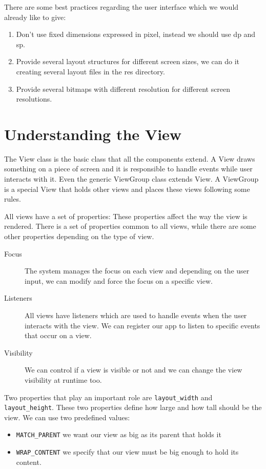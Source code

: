 There are some best practices regarding the user interface which we would already like to give:

\begin{framed}
	
	
	\begin{enumerate}
		\item Don’t use fixed dimensions expressed in pixel, instead we should use dp and sp.
		\item Provide several layout structures for different screen sizes, we can do it creating several layout files in the res directory.
		\item Provide several bitmaps with different resolution for different screen resolutions. 
	\end{enumerate}

\end{framed}



\section{Understanding the View}
The View class is the basic class that all the components extend. A View draws something on a piece of screen and it is
responsible to handle events while user interacts with it. Even the generic ViewGroup class extends View. A ViewGroup
is a special View that holds other views and places these views following some rules.

All views have a set of properties: These properties affect the way the view is rendered. There is a set of properties common
to all views, while there are some other properties depending on the type of view.

\begin{description}
	\item[Focus] The system manages the focus on each view and depending on the user input, we can modify and force the focus on a specific view.
	\item[Listeners] All views have listeners which are used to handle events when the user interacts with the view. We can register our app to listen to specific events that occur on a view.
	\item[Visibility] We can control if a view is visible or not and we can change the view visibility at runtime too.
\end{description}

Two properties that play an important role are \texttt{layout\_width} and \texttt{layout\_height}. These two properties define how large and how tall should be the view. We can use two predefined values:
\begin{itemize}
	\item \texttt{MATCH\_PARENT} we want our view as big as its parent that holds it
	\item \texttt{WRAP\_CONTENT} we specify that our view must be big enough to hold its content.
\end{itemize}

